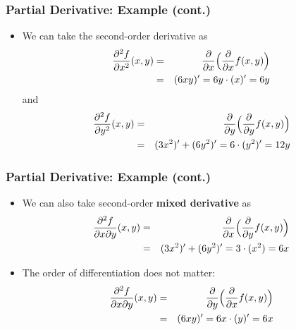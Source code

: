 \documentclass[pdflatex, 12pt]{beamer}
\begin{document}
\begin{frame}
\frametitle{Partial Derivative: Example (cont.)}
\begin{itemize}
\item We can take the second-order derivative as
 \begin{eqnarray}
 \frac{\partial^2 f}{\partial x^2}(x, y) &=& \frac{\partial}{\partial x} \Big(\frac{\partial}{\partial x} f(x, y)\Big) \notag \\
 &=& (6xy)' = 6y \cdot (x)' = 6y \notag 
 \end{eqnarray}
 and
 \begin{eqnarray}
 \frac{\partial^2 f}{\partial y^2}(x, y) &=& \frac{\partial}{\partial y} \Big(\frac{\partial}{\partial y} f(x, y)\Big) \notag \\
 &=& (3x^2)' + (6y^2)' = 6 \cdot (y^2)' = 12y \notag 
 \end{eqnarray}
\end{itemize}
\end{frame}

\begin{frame}
\frametitle{Partial Derivative: Example (cont.)}
\begin{itemize}
\item We can also take second-order \textbf{mixed derivative} as
 \begin{eqnarray}
 \frac{\partial^2 f}{\partial x \partial y}(x, y) &=& \frac{\partial}{\partial x} \Big(\frac{\partial}{\partial y} f(x, y)\Big) \notag \\
 &=& (3x^2)' + (6y^2)' = 3 \cdot (x^2) = 6x \notag 
 \end{eqnarray}
\vspace{0.2cm}
\item The order of differentiation does not matter:
 \begin{eqnarray}
 \frac{\partial^2 f}{\partial x \partial y}(x, y) &=& \frac{\partial}{\partial y} \Big(\frac{\partial}{\partial x} f(x, y)\Big) \notag \\
 &=& (6xy)' = 6x \cdot (y)' = 6x \notag 
 \end{eqnarray}
\end{itemize}
\end{frame}
\end{document}
